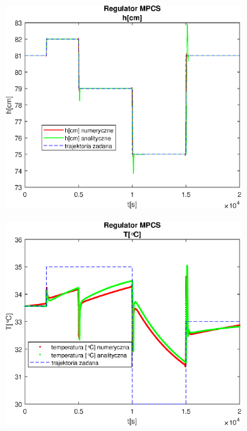 \begin{figure}[h!]
   \centering
   \begin{subfigure}[b]{0.4\textwidth}
      \includegraphics[width=1\linewidth]{img/MPCSnumRK/MPCSRKHN100Nu50l50.eps}
      \caption{}
      \label{fig:fig:MPCSRKN100Nu50l501}
   \end{subfigure}
       
   \begin{subfigure}[b]{0.4\textwidth}
      \includegraphics[width=1\linewidth]{img/MPCSnumRK/MPCSRKTN100Nu50l50.eps}
      \caption{}
      \label{fig:fig:MPCSRKN100Nu50l502}
   \end{subfigure}
       

\end{figure}
